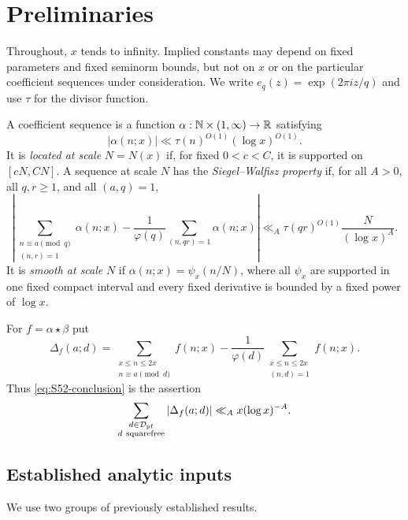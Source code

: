 \section{Preliminaries}\label{sec:preliminaries}

Throughout, $x$ tends to infinity.  Implied constants may depend on fixed
parameters and fixed seminorm bounds, but not on $x$ or on the particular
coefficient sequences under consideration.  We write
$e_q(z)=\exp(2\pi iz/q)$ and use $\tau$ for the divisor function.

\begin{definition}\label{def:coefficients}
A coefficient sequence is a function
$\alpha:\mathbb N\times(1,\infty)\to\mathbb R$ satisfying
\[
 |\alpha(n;x)|\ll \tau(n)^{O(1)}(\log x)^{O(1)}.
\]
It is \emph{located at scale} $N=N(x)$ if, for fixed $0<c<C$, it is
supported on $[cN,CN]$.  A sequence at scale $N$ has the
\emph{Siegel--Walfisz property} if, for all $A>0$, all $q,r\ge1$, and
all $(a,q)=1$,
\begin{equation}\label{eq:sw}
 \left|
 \sum_{\substack{n\equiv a\pmod q\\(n,r)=1}}\alpha(n;x)
 -\frac1{\varphi(q)}\sum_{(n,qr)=1}\alpha(n;x)
 \right|
 \ll_A \tau(qr)^{O(1)}\frac{N}{(\log x)^A}.
\end{equation}
It is \emph{smooth at scale} $N$ if
$\alpha(n;x)=\psi_x(n/N)$, where all $\psi_x$ are supported in one fixed
compact interval and every fixed derivative is bounded by a fixed power of
$\log x$.
\end{definition}

For $f=\alpha\star\beta$ put
\begin{equation}\label{eq:discrepancy}
 \Delta_f(a;d)=
 \sum_{\substack{x\le n\le2x\\n\equiv a\pmod d}}f(n;x)
 -\frac1{\varphi(d)}
 \sum_{\substack{x\le n\le2x\\(n,d)=1}}f(n;x).
\end{equation}
Thus \cref{eq:S52-conclusion} is the assertion
\[
 \sum_{\substack{d\in\DS\\d\ \mathrm{squarefree}}}
 |\Delta_f(a;d)|\ll_Ax(\log x)^{-A}.
\]

\subsection{Established analytic inputs}

We use two groups of previously established results.

